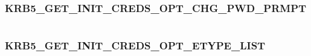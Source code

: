 \documentclass[letterpaper,10pt,english]{sphinxmanual}
\begin{document}
\begin{tabulary}{\linewidth}{|L|L|}
\hline

 & 
\\\hline
\end{tabulary}



\subsubsection{KRB5\_GET\_INIT\_CREDS\_OPT\_CHG\_PWD\_PRMPT}
\label{appdev/refs/macros/KRB5_GET_INIT_CREDS_OPT_CHG_PWD_PRMPT::doc}\label{appdev/refs/macros/KRB5_GET_INIT_CREDS_OPT_CHG_PWD_PRMPT:krb5-get-init-creds-opt-chg-pwd-prmpt}\label{appdev/refs/macros/KRB5_GET_INIT_CREDS_OPT_CHG_PWD_PRMPT:krb5-get-init-creds-opt-chg-pwd-prmpt-data}

\begin{fulllineitems}
\label{appdev/refs/macros/KRB5_GET_INIT_CREDS_OPT_CHG_PWD_PRMPT:KRB5_GET_INIT_CREDS_OPT_CHG_PWD_PRMPT}
\end{fulllineitems}


\begin{tabulary}{\linewidth}{|L|L|}
\hline

 & 
\\\hline
\end{tabulary}



\subsubsection{KRB5\_GET\_INIT\_CREDS\_OPT\_ETYPE\_LIST}
\label{appdev/refs/macros/KRB5_GET_INIT_CREDS_OPT_ETYPE_LIST:krb5-get-init-creds-opt-etype-list-data}\label{appdev/refs/macros/KRB5_GET_INIT_CREDS_OPT_ETYPE_LIST:krb5-get-init-creds-opt-etype-list}\label{appdev/refs/macros/KRB5_GET_INIT_CREDS_OPT_ETYPE_LIST::doc}

\begin{fulllineitems}
\label{appdev/refs/macros/KRB5_GET_INIT_CREDS_OPT_ETYPE_LIST:KRB5_GET_INIT_CREDS_OPT_ETYPE_LIST}
\end{fulllineitems}
\end{document}
